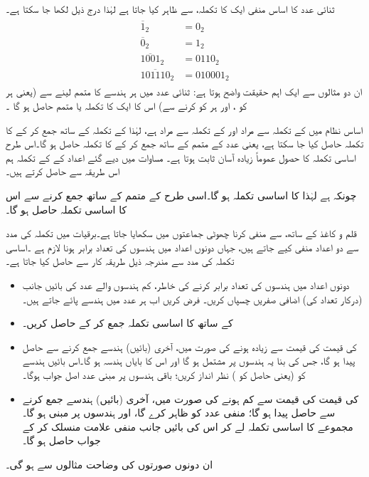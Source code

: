  ثنائی عدد  کا اساس منفی ایک کا تکملہ،  سے ظاہر کیا جاتا ہے لہٰذا درج ذیل لکھا جا سکتا ہے۔
\begin{gather}
\begin{aligned}
\overline{1}_2&=0_2\\
\overline{0}_2&=1_2\\
\overline{1001}_2&=0110_2\\
\overline{101110}_2&=010001_2
\end{aligned}
\end{gather}
ان دو مثالوں سے ایک اہم حقیقت واضح ہوتا ہے: ثنائی عدد میں ہر ہندسے کا متمم لینے سے (یعنی ہر  کو ، اور ہر  کو  کرنے سے) اس کا ایک کا تکملہ یا متمم حاصل ہو گا ۔


 اساس  نظام میں  کے تکملہ سے مراد  اور  کے تکملہ سے مراد  ہے، لہٰذا  کے تکملہ کے ساتھ  جمع کر کے  کا تکملہ حاصل کیا جا سکتا ہے، یعنی عدد کے متمم کے ساتھ  جمع کر کے  کا تکملہ حاصل ہو گا۔اس طرح اساسی تکملہ کا حصول عموماً زیادہ آسان ثابت ہوتا ہے۔ مساوات  میں دیے گئے اعداد کے  کے تکملہ ہم اس طریقہ سے حاصل کرتے ہیں۔
 
چونکہ  ہے لہٰذا  کا اساسی تکملہ  ہو گا۔اسی طرح  کے متمم  کے ساتھ  جمع کرنے سے اس کا اساسی تکملہ  حاصل ہو گا۔

قلم و کاغذ کے ساتھ،  سے  منفی کرنا چھوٹی جماعتوں میں سکھایا جاتا ہے۔برقیات میں تکملہ کی مدد سے دو اعداد منفی کیے جاتے ہیں، جہاں دونوں اعداد میں ہندسوں کی تعداد برابر ہونا لازم ہے ۔اساسی تکملہ کی مدد سے  مندرجہ ذیل طریقہ کار سے حاصل کیا جاتا ہے۔
\begin{itemize}
 \item
 دونوں اعداد میں ہندسوں کی تعداد برابر کرنے کی خاطر، کم ہندسوں والے عدد کی بائیں جانب (درکار تعداد کی) اضافی صفریں چسپاں کریں۔ فرض کریں اب ہر عدد میں  ہندسے پائے جاتے ہیں۔ 
 \item
  کے ساتھ  کا اساسی تکملہ جمع کر کے   حاصل کریں۔
 \item
  کی قیمت  کی قیمت سے زیادہ ہونے کی صورت میں، آخری (بائیں) ہندسے جمع کرنے سے حاصل  پیدا ہو گا، جس کی بنا یہ   ہندسوں پر مشتمل ہو گا اور اس کا بایاں ہندسہ  ہو گا۔اس بائیں ہندسے کو (یعنی حاصل  کو ) نظر انداز کریں؛ باقی  ہندسوں پر مبنی عدد اصل جواب ہوگا۔
 \item
{}کی قیمت  کی قیمت سے کم ہونے کی صورت میں، آخری (بائیں) ہندسے جمع کرنے سے حاصل  پیدا  ہو گا؛  منفی عدد کو ظاہر کرے گا، اور  ہندسوں پر مبنی ہو گا۔مجموعے کا اساسی تکملہ لے کر اس کی بائیں جانب منفی علامت منسلک کر کے جواب حاصل ہو گا۔
\end{itemize}
ان دونوں صورتوں کی وضاحت مثالوں سے ہو گی۔ 

